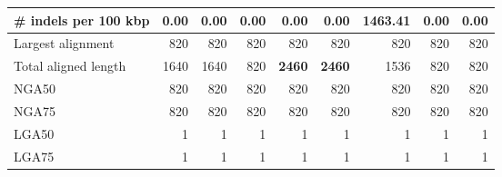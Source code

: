 \documentclass[12pt,a4paper]{article}
\begin{document}
\begin{table}[ht]
\begin{center}
\begin{tabular}{|l*{8}{|r}|}
\# indels per 100 kbp & {\bf 0.00} & {\bf 0.00} & {\bf 0.00} & {\bf 0.00} & {\bf 0.00} & 1463.41 & {\bf 0.00} & {\bf 0.00} \\ \hline
Largest alignment & 820 & 820 & 820 & 820 & 820 & 820 & 820 & 820 \\ \hline
Total aligned length & 1640 & 1640 & 820 & {\bf 2460} & {\bf 2460} & 1536 & 820 & 820 \\ \hline
NGA50 & 820 & 820 & 820 & 820 & 820 & 820 & 820 & 820 \\ \hline
NGA75 & 820 & 820 & 820 & 820 & 820 & 820 & 820 & 820 \\ \hline
LGA50 & 1 & 1 & 1 & 1 & 1 & 1 & 1 & 1 \\ \hline
LGA75 & 1 & 1 & 1 & 1 & 1 & 1 & 1 & 1 \\ \hline
\end{tabular}
\end{center}
\end{table}
\end{document}
